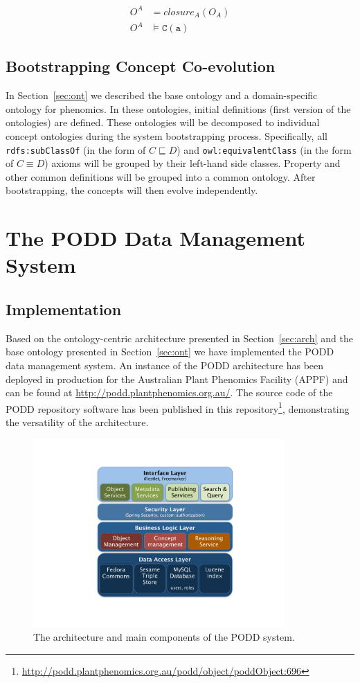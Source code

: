 \documentclass[preprint,12pt]{elsarticle}
\begin{document}
\begin{align}
O^A &= closure_A(O_A)\\
O^A &\models \mathtt{C}(\mathtt{a})
\end{align}

\subsection{Bootstrapping Concept Co-evolution}\label{sec:bootstrap}
In Section~\ref{sec:ont} we described the base ontology and a domain-specific ontology for phenomics. In these ontologies, initial definitions (first version of the ontologies) are defined. These ontologies will be decomposed to individual concept ontologies during the system bootstrapping process. Specifically, all \texttt{rdfs:subClassOf} (in the form of $C\sqsubseteq D$) and \texttt{owl:equivalentClass} (in the form of $C\equiv D$) axioms will be grouped by their left-hand side classes. Property and other common definitions will be grouped into a common ontology. After bootstrapping, the concepts will then evolve independently.

\section{The PODD Data Management System}\label{sec:sys}
\subsection{Implementation}
Based on the ontology-centric architecture presented in Section~\ref{sec:arch} and the base ontology presented in Section~\ref{sec:ont} we have implemented the PODD data management system. An instance of the PODD architecture has been deployed in production for the Australian Plant Phenomics Facility (APPF) and can be found at \url{http://podd.plantphenomics.org.au/}. The source code of the PODD repository software has been published in this repository\footnote{\url{http://podd.plantphenomics.org.au/podd/object/poddObject:696}}, demonstrating the versatility of the architecture.

\begin{figure}[htb]
\centering
\includegraphics[trim = 60mm 30mm 50mm 24mm, clip,height=72mm]{podd_arch.pdf}

\vspace{-8pt} \caption{The architecture and main components of the PODD system.}\label{fig:podd_arch}
\end{figure}
\end{document}
